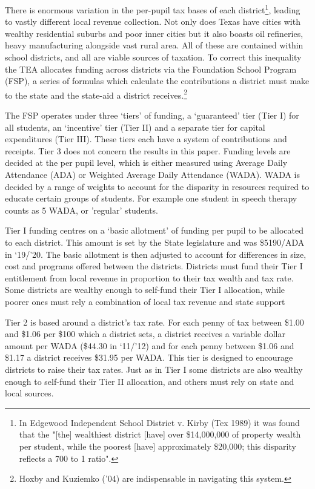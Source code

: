 \documentclass[11pt]{article}
\begin{document}
There is enormous variation in the per-pupil tax bases of each district\footnote{In Edgewood Independent School District v. Kirby (Tex 1989) it was found that the "[the] wealthiest district [have] over \$14,000,000 of property wealth per student, while the poorest [have] approximately \$20,000; this disparity reflects a 700 to 1 ratio". }, leading to vastly different local revenue collection. Not only does Texas have cities with wealthy residential suburbs and poor inner cities but it also boasts oil refineries, heavy manufacturing alongside vast rural area. All of these are contained within school districts, and all are viable sources of taxation. To correct this inequality the TEA allocates funding across districts via the Foundation School Program (FSP), a series of formulas which calculate the contributions a district must make to the state and the state-aid a district receives.\footnote{Hoxby and Kuziemko ('04) are indispensable in navigating this system.} 

The FSP operates under three ‘tiers’ of funding, a ‘guaranteed’ tier (Tier I) for all students, an ‘incentive’ tier (Tier II) and a separate tier for capital expenditures (Tier III). These tiers each have a system of contributions and receipts. Tier 3 does not concern the results in this paper. Funding levels are decided at the per pupil level, which is either measured using Average Daily Attendance (ADA) or Weighted Average Daily Attendance (WADA). WADA is decided by a range of weights to account for the disparity in resources required to educate certain groups of students. For example one student in speech therapy counts as 5 WADA, or 'regular' students.  

Tier I funding centres on a ‘basic allotment’ of funding per pupil to be allocated to each district. This amount is set by the State legislature and was \$5190/ADA in ‘19/’20. The basic allotment is then adjusted to account for differences in size, cost and programs offered between the districts. Districts must fund their Tier I entitlement from local revenue in proportion to their tax wealth and tax rate. Some districts are wealthy enough to self-fund their Tier I allocation, while poorer ones must rely a combination of local tax revenue and state support

Tier 2 is based around a district’s tax rate. For each penny of tax between \$1.00 and \$1.06 per \$100 which a district sets, a district receives a variable dollar amount per WADA (\$44.30 in ‘11/’12) and for each penny between \$1.06 and \$1.17 a district receives \$31.95 per WADA. This tier is designed to encourage districts to raise their tax rates. Just as in Tier I some districts are also wealthy enough to self-fund their Tier II allocation, and others must rely on state and local sources.
\end{document}
